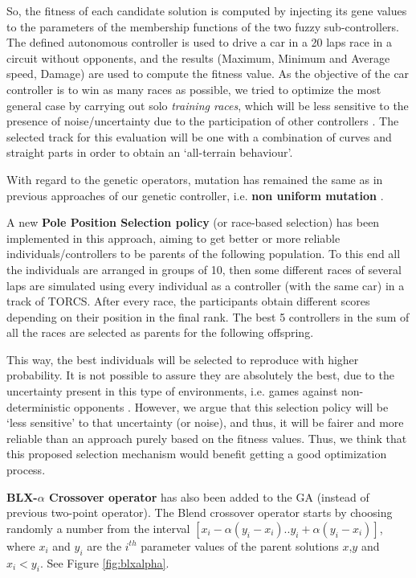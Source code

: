 \documentclass[conference]{IEEEtran}
\begin{document}
So, the fitness of each candidate solution is computed by injecting its gene values to the parameters of the membership functions of the two fuzzy sub-controllers. The defined autonomous controller is used to drive a
car in a 20 laps race in a circuit without opponents, and the results (Maximum, Minimum and Average speed, Damage) are used to compute the fitness value. 
As the objective of the car controller is to win as many races as
possible, we tried to optimize the most general case by carrying out solo {\em training races}, which will be less sensitive to the presence of noise/uncertainty due to the participation of other controllers \cite{merelo2016statistical}.
The selected track for this evaluation will be one with a combination of curves and straight parts in order to obtain an `all-terrain behaviour'.

With regard to the genetic operators, mutation has remained the same as in previous approaches of our genetic controller, i.e. \textbf{non uniform mutation} \cite{mutation1997}. 

A new \textbf{Pole Position Selection policy} (or race-based selection) has been implemented in this approach, aiming to get better or more reliable individuals/controllers to be parents of the following population. To this end all the individuals are arranged in groups of 10, then some different races of  several laps are simulated using every individual as a controller (with the same car) in a track of TORCS. After every race, the participants obtain different scores depending on their position in the final rank. The best 5 controllers in the sum of all the races are selected as parents for the following offspring.

This way, the best individuals will be selected to reproduce with higher probability. It is not possible to assure they are absolutely the best, due to the uncertainty present in this type of environments, i.e. games against non-deterministic opponents \cite{merelo2016statistical}. However, we argue that this selection policy will be `less sensitive' to that uncertainty (or noise), and thus, it will be fairer and more reliable than an approach purely based on the fitness values. Thus, we think that this proposed selection mechanism would benefit getting a good optimization process.


\textbf{BLX-$\alpha$ Crossover operator} \cite{blx2008} has also been added to the GA (instead of previous two-point operator). 
The Blend crossover operator starts by choosing randomly a number from the interval $[x_i-\alpha(y_i-x_i).. y_i+\alpha(y_i-x_i)]$, where $x_i$ and $y_i$ are the
$i^{th}$ parameter values of the parent solutions $x$,$y$ and $x_i < y_i$. See Figure \ref{fig:blxalpha}.
\end{document}
